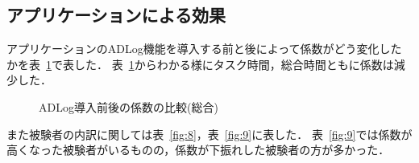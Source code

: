 \subsection{アプリケーションによる効果}
アプリケーションのADLog機能を導入する前と後によって係数がどう変化したかを表~\ref{fig:7}で表した．
表~\ref{fig:7}からわかる様にタスク時間，総合時間ともに係数は減少した．

\begin{figure}[hb]
	\begin{center}
		\caption{ADLog導入前後の係数の比較(総合)}
		\label{fig:7}
	\end{center}
\end{figure}

また被験者の内訳に関しては表~\ref{fig:8}，表~\ref{fig:9}に表した．
表~\ref{fig:9}では係数が高くなった被験者がいるものの，係数が下振れした被験者の方が多かった．

